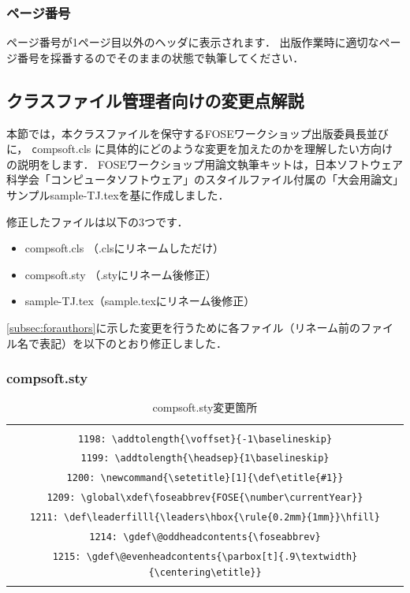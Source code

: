 \documentclass[T,J]{fose} %
\begin{document}
\subsubsection{ページ番号}
ページ番号が1ページ目以外のヘッダに表示されます．
出版作業時に適切なページ番号を採番するのでそのままの状態で執筆してください．

\subsection{クラスファイル管理者向けの変更点解説} \label{sec:differences}
本節では，本クラスファイルを保守するFOSEワークショップ出版委員長並びに， {\texttt compsoft.cls} に具体的にどのような変更を加えたのかを理解したい方向けの説明をします．
FOSEワークショップ用論文執筆キットは，日本ソフトウェア科学会「コンピュータソフトウェア」のスタイルファイル付属の「大会用論文」サンプルsample-TJ.texを基に作成しました．

修正したファイルは以下の3つです．
\begin{itemize}
	\item compsoft.cls （\MakeLowercase{\foseabbrev}.clsにリネームしただけ）
	\item compsoft.sty （\MakeLowercase{\foseabbrev}.styにリネーム後修正）
	\item sample-TJ.tex（sample.texにリネーム後修正）
\end{itemize}

\ref{subsec:forauthors}に示した変更を行うために各ファイル（リネーム前のファイル名で表記）を以下のとおり修正しました．

\subsubsection*{compsoft.sty}
\begin{table}[t]
\caption{compsoft.sty変更箇所}
\label{table:change1}
 	\begin{tabular}{c}
		\begin{tabularx}{47zw}{X}
		\hline
		\verb|1196: \def\leaderfilll{\leaders\hbox{\rule{0.2mm}{1mm}}\hfill}| \\
		\verb|1198: \addtolength{\voffset}{-1\baselineskip}| \\
		\verb|1199: \addtolength{\headsep}{1\baselineskip}| \\
		\verb|1200: \newcommand{\setetitle}[1]{\def\etitle{#1}}| \\
		\verb|1209: \global\xdef\foseabbrev{FOSE{\number\currentYear}}| \\
		\verb|1211: \def\leaderfilll{\leaders\hbox{\rule{0.2mm}{1mm}}\hfill}| \\
		\verb|1214: \gdef\@oddheadcontents{\foseabbrev}| \\
		\verb|1215: \gdef\@evenheadcontents{\parbox[t]{.9\textwidth}{\centering\etitle}}| \\
		\hline
		\end{tabularx}
	\end{tabular}
\end{table}
\end{document}
